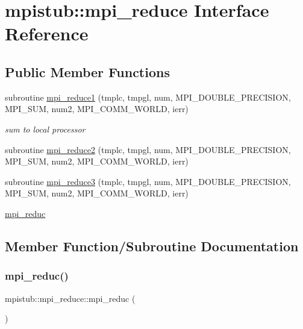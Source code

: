 \hypertarget{interfacempistub_1_1mpi__reduce}{}\section{mpistub\+::mpi\+\_\+reduce Interface Reference}
\label{interfacempistub_1_1mpi__reduce}
\subsection*{Public Member Functions}
\begin{DoxyCompactItemize}
\item 
subroutine \mbox{\hyperlink{interfacempistub_1_1mpi__reduce_a3f7961cd892ce3d82b0a8104ced672d3}{mpi\+\_\+reduce1}} (tmplc, tmpgl, num, M\+P\+I\+\_\+\+D\+O\+U\+B\+L\+E\+\_\+\+P\+R\+E\+C\+I\+S\+I\+ON, M\+P\+I\+\_\+\+S\+UM, num2, M\+P\+I\+\_\+\+C\+O\+M\+M\+\_\+\+W\+O\+R\+LD, ierr)
\begin{DoxyCompactList}\small\item\em sum to local processor \end{DoxyCompactList}\item 
subroutine \mbox{\hyperlink{interfacempistub_1_1mpi__reduce_a7b271773423478f20fd2b987744da5b3}{mpi\+\_\+reduce2}} (tmplc, tmpgl, num, M\+P\+I\+\_\+\+D\+O\+U\+B\+L\+E\+\_\+\+P\+R\+E\+C\+I\+S\+I\+ON, M\+P\+I\+\_\+\+S\+UM, num2, M\+P\+I\+\_\+\+C\+O\+M\+M\+\_\+\+W\+O\+R\+LD, ierr)
\item 
subroutine \mbox{\hyperlink{interfacempistub_1_1mpi__reduce_a33962320ef3960eb86477c8452aba795}{mpi\+\_\+reduce3}} (tmplc, tmpgl, num, M\+P\+I\+\_\+\+D\+O\+U\+B\+L\+E\+\_\+\+P\+R\+E\+C\+I\+S\+I\+ON, M\+P\+I\+\_\+\+S\+UM, num2, M\+P\+I\+\_\+\+C\+O\+M\+M\+\_\+\+W\+O\+R\+LD, ierr)
\item 
\mbox{\hyperlink{interfacempistub_1_1mpi__reduce_abee25f242ab07de205c218c10ca7a099}{mpi\+\_\+reduc}}
\end{DoxyCompactItemize}


\subsection{Member Function/\+Subroutine Documentation}
\mbox{\label{interfacempistub_1_1mpi__reduce_abee25f242ab07de205c218c10ca7a099}} 
\subsubsection{\texorpdfstring{mpi\_reduc()}{mpi\_reduc()}}
{\footnotesize\ttfamily mpistub\+::mpi\+\_\+reduce\+::mpi\+\_\+reduc (\begin{DoxyParamCaption}{ }\end{DoxyParamCaption})}

